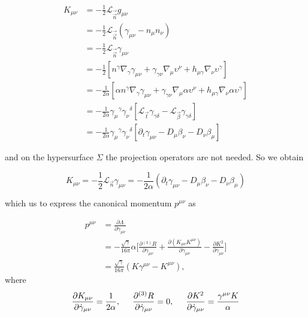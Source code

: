 \documentclass[11pt,a4paper,headinclude=true,DIV=14,BCOR=8mm,chapterprefix,listof=totoc,twoside,openright,abstracton]{scrbook}
\begin{document}
\begin{align}
    K_{\mu\nu} &= -\frac{1}{2}\mathcal{L}_{\vec{\vec{n}}}g_{\mu\nu} \\
    &= -\frac{1}{2}\mathcal{L}_{\vec{\vec{n}}}(\gamma_{\mu\nu}-n_{\mu}n_{\nu}) \\
    &= -\frac{1}{2}\mathcal{L}_{\vec{\vec{n}}}\gamma_{\mu\nu} \\
    &= -\frac{1}{2}[n^{\gamma}\nabla_{\gamma}\gamma_{\mu\nu} + \gamma_{\gamma\nu}\nabla_{\mu}\upsilon^{\nu} + h_{\mu\gamma}\nabla_{\nu}\upsilon^{\gamma}] \\
    &= -\frac{1}{2\alpha}[\alpha n^{\gamma}\nabla_{\gamma}\gamma_{\mu\nu} + \gamma_{\gamma\nu}\nabla_{\mu}\alpha\upsilon^{\nu} + h_{\mu\gamma}\nabla_{\nu}\alpha\upsilon^{\gamma}] \\
    &= -\frac{1}{2\alpha}{\gamma_{\mu}}^{\gamma}{\gamma_{\nu}}^{\delta}[\mathcal{L}_{\vec{t}}\gamma_{\gamma\delta}-\mathcal{L}_{\vec{\beta}}\gamma_{\gamma\delta}] \\
    &= -\frac{1}{2\alpha}{\gamma_{\mu}}^{\gamma}{\gamma_{\nu}}^{\delta}[\partial_t\gamma_{\mu\nu}-D_{\mu}\beta_{\nu}-D_{\nu}\beta_{\mu}]
\end{align}

and on the hypersurface $\Sigma$ the projection operators are not needed. So we obtain

\begin{equation}
    K_{\mu\nu} = -\frac{1}{2}\mathcal{L}_{\vec{n}}\gamma_{\mu\nu}=-\frac{1}{2\alpha}(\partial_t\gamma_{\mu\nu}-D_{\mu}\beta_{\nu}-D_{\nu}\beta_{\mu})
\end{equation}

which us to express the canonical momentum $p^{\mu\nu}$ as

\begin{align}
    p^{\mu\nu} &= \frac{\partial\Lambda}{\partial\dot{\gamma}_{\mu\nu}} \\
    &= -\frac{\sqrt{\gamma}}{16\pi}\alpha\Bigg[\frac{\partial {^{(3)}R}}{\partial\dot{\gamma}_{\mu\nu}} + \frac{\partial(K_{\mu\nu}K^{\mu\nu})}{\partial\dot{\gamma}_{\mu\nu}} - \frac{\partial K^2}{\partial\dot{\gamma}_{\mu\nu}}\Bigg] \\
    &= \frac{\sqrt{\gamma}}{16\pi}(K\gamma^{\mu\nu} - K^{\mu\nu}),
\end{align}
where 
\begin{equation}
    \frac{\partial K_{\mu\nu}}{\partial \dot{\gamma}_{\mu\nu}} = \frac{1}{2\alpha}, \hspace{5mm} \frac{\partial {^{(3)}R}}{\partial \dot{\gamma}_{\mu\nu}} = 0, \hspace{5mm}\frac{\partial K^2}{\partial \dot{\gamma}_{\mu\nu}} = \frac{\gamma^{\mu\nu}K}{\alpha}
\end{equation}
\end{document}
